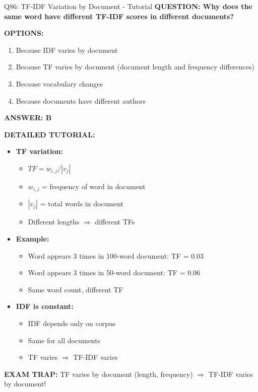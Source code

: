 \documentclass[8pt]{beamer}
\begin{document}
	\begin{frame}{Q86: TF-IDF Variation by Document - Tutorial}
		\fontsize{6.5}{7.5}\selectfont
		\textbf{QUESTION: Why does the same word have different TF-IDF scores in different documents?}
		
		\vspace{0.1cm}
		\textbf{OPTIONS:}
		\begin{enumerate}
			\item Because IDF varies by document
			\item Because TF varies by document (document length and frequency differences)
			\item Because vocabulary changes
			\item Because documents have different authors
		\end{enumerate}
		
		\vspace{0.1cm}
		\textcolor{myblue}{\textbf{ANSWER: B}}
		
		\vspace{0.1cm}
		\textbf{DETAILED TUTORIAL:}
		\begin{itemize}
			\item \textbf{TF variation:}
			\begin{itemize}
				\item $TF = w_{i,j} / |v_j|$
				\item $w_{i,j}$ = frequency of word in document
				\item $|v_j|$ = total words in document
				\item Different lengths $\Rightarrow$ different TFs
			\end{itemize}
			\item \textbf{Example:}
			\begin{itemize}
				\item Word appears 3 times in 100-word document: TF = 0.03
				\item Word appears 3 times in 50-word document: TF = 0.06
				\item Same word count, different TF
			\end{itemize}
			\item \textbf{IDF is constant:}
			\begin{itemize}
				\item IDF depends only on corpus
				\item Same for all documents
				\item TF varies $\Rightarrow$ TF-IDF varies
			\end{itemize}
		\end{itemize}
		
		\textcolor{myred}{\textbf{EXAM TRAP:}} TF varies by document (length, frequency) $\Rightarrow$ \textcolor{myblue}{TF-IDF varies by document}!
	\end{frame}
	
\end{document}
